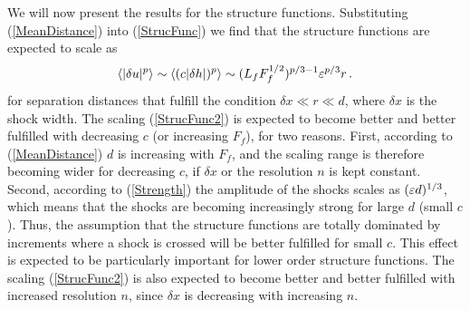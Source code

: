 We will now present the results for the structure functions. Substituting
(\ref{MeanDistance}) into (\ref{StrucFunc}) we find that the structure
functions are expected to scale as
\begin{equation} \label{StrucFunc2}
\langle |\delta u |^p \rangle  \sim \langle (c|\delta h |)^p \rangle \sim  (L_f F_f^{1/2})^{p/3-1}  \varepsilon^{p/3}  r  \, .
\end{equation}
for separation distances that fulfill the condition $ \delta x \ll r \ll d $,
where $ \delta x $ is the shock width. The scaling (\ref{StrucFunc2}) is
expected to become better and better fulfilled with decreasing $ c $ (or
increasing $ F_f $), for two reasons. First, according to (\ref{MeanDistance})
$ d $ is increasing with $ F_f $, and the scaling range is therefore becoming
wider for decreasing $ c $, if $ \delta x $ or the resolution $ n $ is kept
constant. Second, according to (\ref{Strength}) the amplitude of the shocks
scales as $ (\varepsilon d)^{1/3} $, which means that the shocks are becoming
increasingly strong for large $ d $ (small $ c $). Thus, the assumption that
the structure functions are totally dominated by increments where a shock is
crossed will be better fulfilled for small $ c $. This effect is expected to be
particularly important for lower order structure functions. The scaling
(\ref{StrucFunc2}) is also expected to become better and better fulfilled with
increased resolution $ n $, since $ \delta x $ is decreasing with increasing $
n $.

